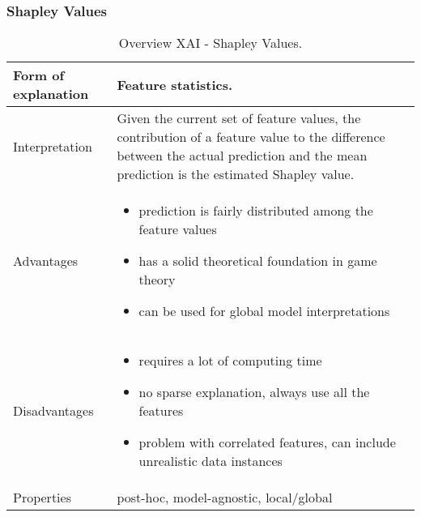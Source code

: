 \subsubsection{Shapley Values}
\begin{table}[H]
  \centering
  \begin{tabular}{|p{}|p{}|}
    \hline
    Form of \newline explanation & 
    Feature statistics. \\
    
    \hline
    Interpretation & 
    Given the current set of feature values, the contribution of a feature value to the difference between the actual prediction and the mean prediction is the estimated Shapley value. \\
    \hline
    Advantages &
    \begin{itemize}[nosep, left=0em]
        \item prediction is fairly distributed among the feature values
        \item has a solid theoretical foundation in game theory
        \item can be used for global model interpretations
    \end{itemize} \\
    
    \hline
    Disadvantages &
    \begin{itemize}[nosep, left=0em]
        \item requires a lot of computing time
        \item no sparse explanation, always use all the features
        \item problem with correlated features, can include unrealistic data instances
    \end{itemize} \\
    
    \hline
    Properties & 
    post-hoc, model-agnostic, local/global  \\
    
    \hline
  \end{tabular}
  \caption{Overview XAI - Shapley Values.}
\end{table}


